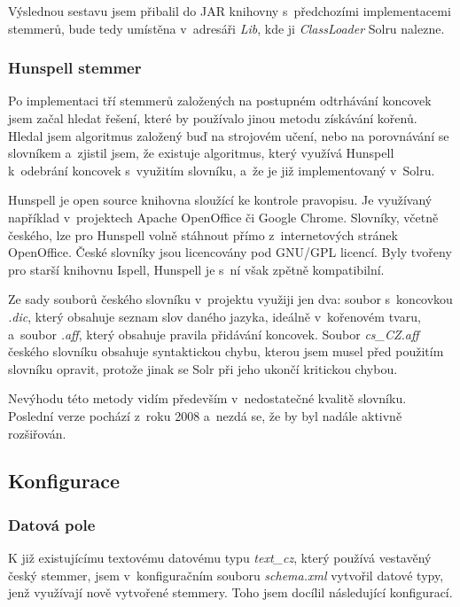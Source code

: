 Výslednou sestavu jsem přibalil do JAR knihovny s~předchozími implementacemi stemmerů, bude tedy umístěna v~adresáři \emph{Lib}, kde ji \emph{ClassLoader} Solru nalezne.

\subsubsection{Hunspell stemmer}
Po implementaci tří stemmerů založených na postupném odtrhávání koncovek jsem začal hledat řešení, které by používalo jinou metodu získávání kořenů. Hledal jsem algoritmus založený buď na strojovém učení, nebo na porovnávání se slovníkem a~zjistil jsem, že existuje algoritmus, který využívá Hunspell k~odebrání koncovek s~využitím slovníku, a~že je již implementovaný v~Solru.

Hunspell je open source knihovna sloužící ke kontrole pravopisu. Je využívaný například v~projektech Apache OpenOffice či Google Chrome. Slovníky, včetně českého, lze pro Hunspell volně stáhnout přímo z~internetových stránek OpenOffice\cite{openoffice}. České slovníky jsou licencovány pod GNU/GPL licencí. Byly tvořeny pro starší knihovnu Ispell, Hunspell je s~ní však zpětně kompatibilní.

Ze sady souborů českého slovníku v~projektu využiji jen dva: soubor s~koncovkou \emph{.dic}, který obsahuje seznam slov daného jazyka, ideálně v~kořenovém tvaru, a~soubor \emph{.aff}, který obsahuje pravila přidávání koncovek\cite{zdrojak}. Soubor \emph{cs\_CZ.aff} českého slovníku obsahuje syntaktickou chybu, kterou jsem musel před použitím slovníku opravit, protože jinak se Solr při jeho  ukončí kritickou chybou.

Nevýhodu této metody vidím především v~nedostatečné kvalitě slovníku. Poslední verze pochází z~roku 2008 a~nezdá se, že by byl nadále aktivně rozšiřován.

\subsection{Konfigurace} \label{sorlconfig}
\subsubsection{Datová pole}
K již existujícímu textovému datovému typu \emph{text\_cz}, který používá vestavěný český stemmer, jsem v~konfiguračním souboru \emph{schema.xml} vytvořil datové typy, jenž využívají nově vytvořené stemmery. Toho jsem docílil následující konfigurací.

